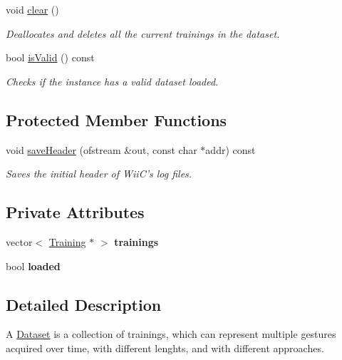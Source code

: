 \begin{DoxyCompactItemize}
void \hyperlink{class_dataset_a67744c3bdc87acd2a8189b9c4fbcd192}{clear} ()
\begin{DoxyCompactList}\small\item\em Deallocates and deletes all the current trainings in the dataset. \end{DoxyCompactList}\item 
bool \hyperlink{class_dataset_a51c528f515d44baee36589e8de11af50}{is\-Valid} () const 
\begin{DoxyCompactList}\small\item\em Checks if the instance has a valid dataset loaded. \end{DoxyCompactList}\end{DoxyCompactItemize}
\subsection*{Protected Member Functions}
\begin{DoxyCompactItemize}
\item 
void \hyperlink{class_dataset_a23110f7d2b6bc77a388e8dafee9772b3}{save\-Header} (ofstream \&out, const char $\ast$addr) const 
\begin{DoxyCompactList}\small\item\em Saves the initial header of Wii\-C's log files. \end{DoxyCompactList}\end{DoxyCompactItemize}
\subsection*{Private Attributes}
\begin{DoxyCompactItemize}
\item 
\hypertarget{class_dataset_a4491c33243fb10969489cc4c3e25de02}{vector$<$ \hyperlink{class_training}{Training} $\ast$ $>$ {\bfseries trainings}}\label{class_dataset_a4491c33243fb10969489cc4c3e25de02}

\item 
\hypertarget{class_dataset_a55ac9c41a1f3a2bc08ca053df147d163}{bool {\bfseries loaded}}\label{class_dataset_a55ac9c41a1f3a2bc08ca053df147d163}

\end{DoxyCompactItemize}


\subsection{Detailed Description}
A \hyperlink{class_dataset}{Dataset} is a collection of trainings, which can represent multiple gestures acquired over time, with different lenghts, and with different approaches. 

